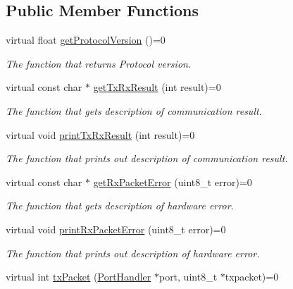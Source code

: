 \subsection*{Public Member Functions}
\begin{DoxyCompactItemize}
\item 
virtual float \hyperlink{classmercury_1_1_packet_handler_adddbcda3ac5e3fa954d57cce01d7d8b0}{get\+Protocol\+Version} ()=0
\begin{DoxyCompactList}\small\item\em The function that returns Protocol version. \end{DoxyCompactList}\item 
virtual const char $\ast$ \hyperlink{classmercury_1_1_packet_handler_a0c752d5086c323bb21b842d2162f7b3a}{get\+Tx\+Rx\+Result} (int result)=0
\begin{DoxyCompactList}\small\item\em The function that gets description of communication result. \end{DoxyCompactList}\item 
virtual void \hyperlink{classmercury_1_1_packet_handler_aa87d54e892b2ef2bbb5136e95ed00e0c}{print\+Tx\+Rx\+Result} (int result)=0
\begin{DoxyCompactList}\small\item\em The function that prints out description of communication result. \end{DoxyCompactList}\item 
virtual const char $\ast$ \hyperlink{classmercury_1_1_packet_handler_a5c65f7193cdc11a03de69deae4fb0a88}{get\+Rx\+Packet\+Error} (uint8\+\_\+t error)=0
\begin{DoxyCompactList}\small\item\em The function that gets description of hardware error. \end{DoxyCompactList}\item 
virtual void \hyperlink{classmercury_1_1_packet_handler_a63da34ba48010ef1836972484b46da4e}{print\+Rx\+Packet\+Error} (uint8\+\_\+t error)=0
\begin{DoxyCompactList}\small\item\em The function that prints out description of hardware error. \end{DoxyCompactList}\item 
virtual int \hyperlink{classmercury_1_1_packet_handler_acc3f84f0d952dc2d827d8500de512abe}{tx\+Packet} (\hyperlink{classmercury_1_1_port_handler}{Port\+Handler} $\ast$port, uint8\+\_\+t $\ast$txpacket)=0

\end{DoxyCompactItemize}
